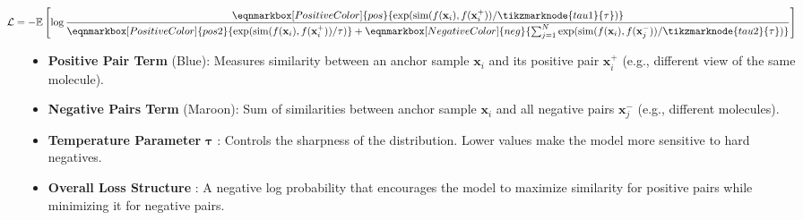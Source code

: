 \begin{tcolorbox}[
    title=InfoNCE Loss Function,
    breakable,
    enhanced,
    colback=white,
    colframe=black!30,
    colbacktitle=black!10,
    coltitle=black,
    fonttitle=\bfseries,
    boxrule=0.5mm,
    left=2mm,
    right=2mm,
    top=4mm,
    bottom=4mm,
    middle=10mm
]

\begin{center}
\begin{minipage}{0.9\linewidth}

\begin{equation}
\label{eq:infonce}
\hspace*{-2em}
\mathcal{L} = 
-\mathbb{E} \left[ \log \frac{
\eqnmarkbox[PositiveColor]{pos}{\exp({\text{sim}(f(\mathbf{x}_i), f(\mathbf{x}_i^+))/\tikzmarknode{tau1}{\tau}})}
}{
\eqnmarkbox[PositiveColor]{pos2}{\exp({\text{sim}(f(\mathbf{x}_i), f(\mathbf{x}_i^+))/\tau})} + 
\eqnmarkbox[NegativeColor]{neg}{\sum_{j=1}^{N} \exp({\text{sim}(f(\mathbf{x}_i), f(\mathbf{x}_j^-))/\tikzmarknode{tau2}{\tau}})}
} \right]
\end{equation}


\end{minipage}
\end{center}

\tcblower


\begin{itemize}
\item \textbf{Positive Pair Term} ({\color{PositiveColor}Blue}): Measures similarity between an anchor sample $\mathbf{x}_i$ and its positive pair $\mathbf{x}_i^+$ (e.g., different view of the same molecule).

\item \textbf{Negative Pairs Term} ({\color{NegativeColor}Maroon}): Sum of similarities between anchor sample $\mathbf{x}_i$ and all negative pairs $\mathbf{x}_j^-$ (e.g., different molecules).

\item \textbf{Temperature Parameter} $\boldsymbol{\tau}$ %
: Controls the sharpness of the distribution. Lower values make the model more sensitive to hard negatives.

\item \textbf{Overall Loss Structure} %
: A negative log probability that encourages the model to maximize similarity for positive pairs while minimizing it for negative pairs.
\end{itemize}

\end{tcolorbox}


